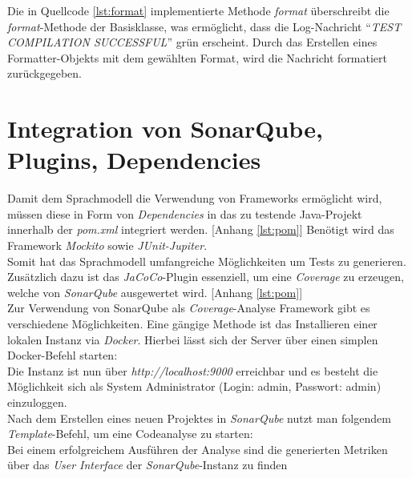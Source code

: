 Die in Quellcode \ref{lst:format} implementierte Methode \textit{format} überschreibt die \textit{format}-Methode der Basisklasse, was ermöglicht, dass die Log-Nachricht ``\textit{TEST COMPILATION SUCCESSFUL}'' grün erscheint. Durch das Erstellen eines Formatter-Objekts mit dem gewählten Format, wird die Nachricht formatiert zurückgegeben.\\
\vspace{-.3cm}

\section{Integration von SonarQube, Plugins, Dependencies}\label{sec:sonar}
Damit dem Sprachmodell die Verwendung von Frameworks ermöglicht wird, müssen diese in Form von \textit{Dependencies} in das zu testende Java-Projekt innerhalb der \textit{pom.xml} integriert werden. [Anhang \ref{lst:pom}] Benötigt wird das Framework \textit{Mockito} sowie \textit{JUnit-Jupiter}.\\
Somit hat das Sprachmodell umfangreiche Möglichkeiten um Tests zu generieren. Zusätzlich dazu ist das \textit{JaCoCo}-Plugin essenziell, um eine \textit{Coverage} zu erzeugen, welche von \textit{SonarQube} ausgewertet wird. [Anhang \ref{lst:pom}]
\\Zur Verwendung von SonarQube als \textit{Coverage}-Analyse Framework gibt es verschiedene Möglichkeiten. Eine gängige Methode ist das Installieren einer lokalen Instanz via \textit{Docker}. \cite*{TryOutSonarQube} Hierbei lässt sich der Server über einen simplen Docker-Befehl starten:\\[-.2cm]
\vspace{-.3cm} Die Instanz ist nun über \textit{http://localhost:9000} erreichbar und es besteht die Möglichkeit sich als System Administrator (Login: admin, Passwort: admin) einzuloggen.\\ Nach dem Erstellen eines neuen Projektes in \textit{SonarQube} nutzt man folgendem \textit{Template}-Befehl, um eine Codeanalyse zu starten:\\[-.2cm]
\vspace{-.3cm}
Bei einem erfolgreichem Ausführen der Analyse sind die generierten Metriken über das \textit{User Interface} der \textit{SonarQube}-Instanz zu finden

